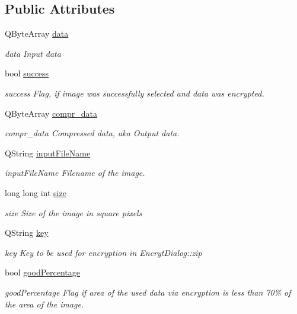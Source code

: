 \subsection*{Public Attributes}
\begin{DoxyCompactItemize}
\item 
Q\-Byte\-Array \hyperlink{class_encrypt_dialog_acf3a8bbce90d99ef17fec093c35b1008}{data}
\begin{DoxyCompactList}\small\item\em data Input data \end{DoxyCompactList}\item 
bool \hyperlink{class_encrypt_dialog_ada4900bcd40894d9c098c65aa4066ac9}{success}
\begin{DoxyCompactList}\small\item\em success Flag, if image was successfully selected and data was encrypted. \end{DoxyCompactList}\item 
Q\-Byte\-Array \hyperlink{class_encrypt_dialog_a3e8998aa39696cbd1242f6420ef18143}{compr\-\_\-data}
\begin{DoxyCompactList}\small\item\em compr\-\_\-data Compressed data, aka Output data. \end{DoxyCompactList}\item 
Q\-String \hyperlink{class_encrypt_dialog_a859b1bc2f032a247632b879bf8663d0b}{input\-File\-Name}
\begin{DoxyCompactList}\small\item\em input\-File\-Name Filename of the image. \end{DoxyCompactList}\item 
long long int \hyperlink{class_encrypt_dialog_a7fff26f838ab50f807744cd2c4bed033}{size}
\begin{DoxyCompactList}\small\item\em size Size of the image in square pixels \end{DoxyCompactList}\item 
Q\-String \hyperlink{class_encrypt_dialog_a1afdef3c665fb0d0fae06d1df8e84951}{key}
\begin{DoxyCompactList}\small\item\em key Key to be used for encryption in Encryt\-Dialog\-::zip \end{DoxyCompactList}\item 
bool \hyperlink{class_encrypt_dialog_a0c821b893cfddd7a6c07bbd270ba49e9}{good\-Percentage}
\begin{DoxyCompactList}\small\item\em good\-Percentage Flag if area of the used data via encryption is less than 70\% of the area of the image. \end{DoxyCompactList}\item 

\end{DoxyCompactItemize}

